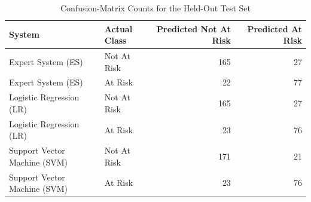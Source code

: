 \begin{table}[H]
\centering
\caption{Confusion-Matrix Counts for the Held-Out Test Set}
\label{tab:confusion-matrices}
\begin{tabular}{llrr}
\toprule
System & Actual Class & Predicted Not At Risk & Predicted At Risk \\
\midrule
Expert System (ES) & Not At Risk & 165 & 27 \\
Expert System (ES) & At Risk & 22 & 77 \\
Logistic Regression (LR) & Not At Risk & 165 & 27 \\
Logistic Regression (LR) & At Risk & 23 & 76 \\
Support Vector Machine (SVM) & Not At Risk & 171 & 21 \\
Support Vector Machine (SVM) & At Risk & 23 & 76 \\
\bottomrule
\end{tabular}
\end{table}
